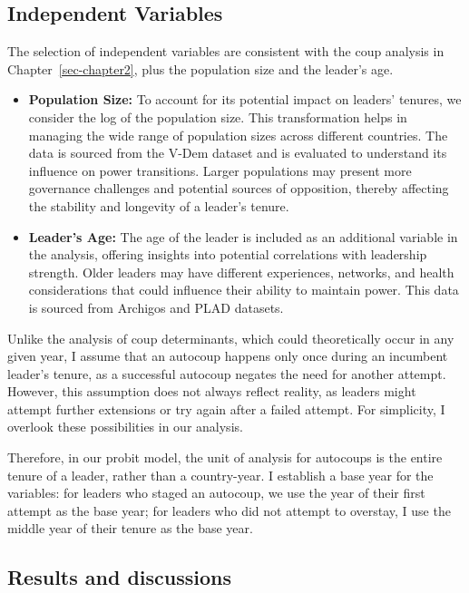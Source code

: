 \documentclass[
  12pt,
]{report}
\begin{document}
\subsection{Independent Variables}\label{independent-variables}

The selection of independent variables are consistent with the coup
analysis in Chapter~\ref{sec-chapter2}, plus the population size and the
leader's age.

\begin{itemize}
\item
  \textbf{Population Size:} To account for its potential impact on
  leaders' tenures, we consider the log of the population size. This
  transformation helps in managing the wide range of population sizes
  across different countries. The data is sourced from the V-Dem dataset
  and is evaluated to understand its influence on power transitions.
  Larger populations may present more governance challenges and
  potential sources of opposition, thereby affecting the stability and
  longevity of a leader's tenure.
\item
  \textbf{Leader's Age:} The age of the leader is included as an
  additional variable in the analysis, offering insights into potential
  correlations with leadership strength. Older leaders may have
  different experiences, networks, and health considerations that could
  influence their ability to maintain power. This data is sourced from
  Archigos and PLAD datasets.
\end{itemize}

Unlike the analysis of coup determinants, which could theoretically
occur in any given year, I assume that an autocoup happens only once
during an incumbent leader's tenure, as a successful autocoup negates
the need for another attempt. However, this assumption does not always
reflect reality, as leaders might attempt further extensions or try
again after a failed attempt. For simplicity, I overlook these
possibilities in our analysis.

Therefore, in our probit model, the unit of analysis for autocoups is
the entire tenure of a leader, rather than a country-year. I establish a
base year for the variables: for leaders who staged an autocoup, we use
the year of their first attempt as the base year; for leaders who did
not attempt to overstay, I use the middle year of their tenure as the
base year.

\subsection{Results and discussions}\label{results-and-discussions}
\end{document}
